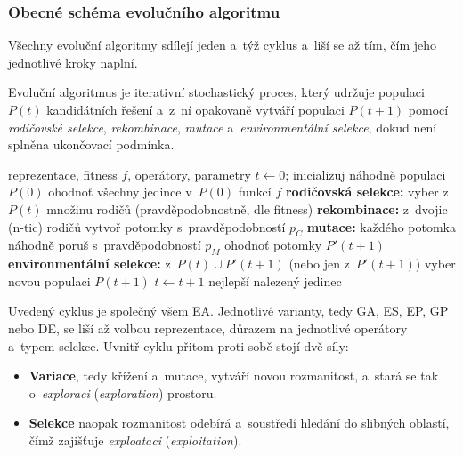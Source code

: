 \documentclass[11pt,a4paper]{article}
\theoremstyle{definition}
\begin{document}
\subsubsection{Obecné schéma evolučního algoritmu}

Všechny evoluční algoritmy sdílejí jeden a~týž cyklus a~liší se až tím, čím jeho jednotlivé
kroky naplní.

\begin{defbox}
Evoluční algoritmus je iterativní stochastický proces, který udržuje populaci
$P(t)$ kandidátních řešení a~z~ní opakovaně vytváří populaci $P(t+1)$ pomocí
\emph{rodičovské selekce}, \emph{rekombinace}, \emph{mutace} a~\emph{environmentální
selekce}, dokud není splněna ukončovací podmínka.
\end{defbox}

\begin{algorithm}[!ht]
\caption{Obecné schéma evolučního algoritmu}
\begin{algorithmic}[1]
\Require reprezentace, fitness $f$, operátory, parametry
\State $t \gets 0$; inicializuj náhodně populaci $P(0)$
\State ohodnoť všechny jedince v~$P(0)$ funkcí $f$
  \State \textbf{rodičovská selekce:} vyber z~$P(t)$ množinu rodičů (pravděpodobnostně, dle fitness)
  \State \textbf{rekombinace:} z~dvojic (n-tic) rodičů vytvoř potomky s~pravděpodobností $p_C$
  \State \textbf{mutace:} každého potomka náhodně poruš s~pravděpodobností $p_M$
  \State ohodnoť potomky $P'(t+1)$
  \State \textbf{environmentální selekce:} z~$P(t) \cup P'(t+1)$ (nebo jen z~$P'(t+1)$) vyber novou populaci $P(t+1)$
  \State $t \gets t+1$
\EndWhile
\Ensure nejlepší nalezený jedinec
\end{algorithmic}
\end{algorithm}

Uvedený cyklus je společný všem EA. Jednotlivé varianty, tedy GA, ES, EP, GP nebo DE, se liší
až volbou reprezentace, důrazem na jednotlivé operátory a~typem selekce. Uvnitř cyklu přitom
proti sobě stojí dvě síly:

\begin{itemize}
\item \textbf{Variace}, tedy křížení a~mutace, vytváří novou rozmanitost, a~stará
  se tak o~\emph{exploraci} (\emph{exploration}) prostoru.
\item \textbf{Selekce} naopak rozmanitost odebírá a~soustředí hledání do slibných
  oblastí, čímž zajišťuje \emph{exploataci} (\emph{exploitation}).
\end{itemize}
\end{document}

